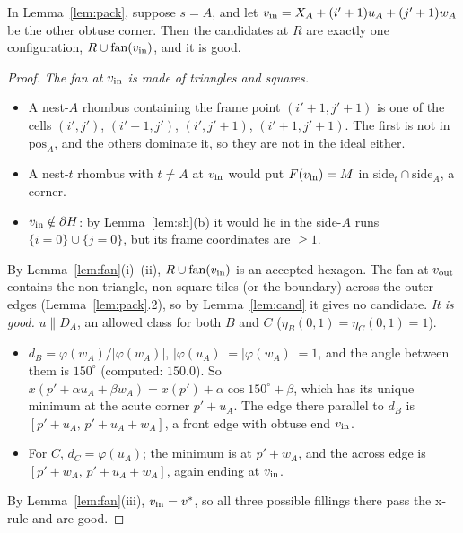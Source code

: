 \documentclass[11pt]{article}
\theoremstyle{definition}\newtheorem{definition}[theorem]{Definition}\newtheorem{remark}[theorem]{Remark}
\begin{document}
\begin{lemma}\label{lem:srcA}
In Lemma~\ref{lem:pack}, suppose $s=A$, and let $v_{\rm in}=X_A+(i'+1)u_A+(j'+1)w_A$ be the other obtuse corner. Then the candidates at $R$ are exactly one configuration, $R\cup\mathrm{fan}(v_{\rm in})$, and it is good.
\end{lemma}
\begin{proof}
\emph{The fan at $v_{\rm in}$ is made of triangles and squares.}
\begin{itemize}
\item A nest-$A$ rhombus containing the frame point $(i'+1,j'+1)$ is one of the cells $(i',j')$, $(i'+1,j')$, $(i',j'+1)$, $(i'+1,j'+1)$. The first is not in $\mathrm{pos}_A$, and the others dominate it, so they are not in the ideal either.
\item A nest-$t$ rhombus with $t\ne A$ at $v_{\rm in}$ would put $F(v_{\rm in})=M$ in $\mathrm{side}_t\cap\mathrm{side}_A$, a corner.
\item $v_{\rm in}\notin\partial H$: by Lemma~\ref{lem:sh}(b) it would lie in the side-$A$ runs $\{i=0\}\cup\{j=0\}$, but its frame coordinates are $\ge1$.
\end{itemize}
By Lemma~\ref{lem:fan}(i)--(ii), $R\cup\mathrm{fan}(v_{\rm in})$ is an accepted hexagon. The fan at $v_{\rm out}$ contains the non-triangle, non-square tiles (or the boundary) across the outer edges (Lemma~\ref{lem:pack}.2), so by Lemma~\ref{lem:cand} it gives no candidate.
\emph{It is good.} $u\parallel D_A$, an allowed class for both $B$ and $C$ ($\eta_B(0,1)=\eta_C(0,1)=1$).
\begin{itemize}
\item $d_B=\varphi(w_A)/|\varphi(w_A)|$, $|\varphi(u_A)|=|\varphi(w_A)|=1$, and the angle between them is $150^\circ$ (computed: $150.0$). So $x(p'+\alpha u_A+\beta w_A)=x(p')+\alpha\cos150^\circ+\beta$, which has its unique minimum at the acute corner $p'+u_A$. The edge there parallel to $d_B$ is $[p'+u_A,\,p'+u_A+w_A]$, a front edge with obtuse end $v_{\rm in}$.
\item For $C$, $d_C=\varphi(u_A)$; the minimum is at $p'+w_A$, and the across edge is $[p'+w_A,\,p'+u_A+w_A]$, again ending at $v_{\rm in}$.
\end{itemize}
By Lemma~\ref{lem:fan}(iii), $v_{\rm in}=v^*$, so all three possible fillings there pass the x-rule and are good.
\end{proof}
\end{document}
